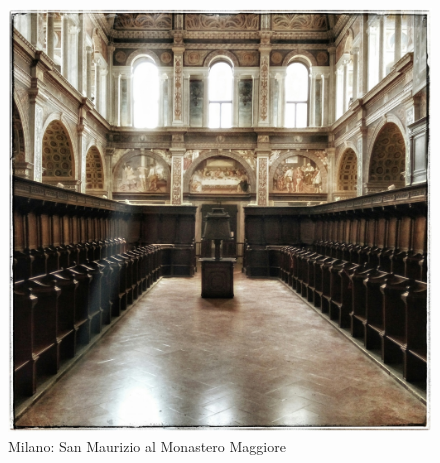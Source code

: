 \documentclass[nols]{tufte-handout}
\begin{document}
\begin{figure}[!b]
  \includegraphics[width=0.8\linewidth]{thumb-lesson_XX.jpeg}
  \caption{Milano: San Maurizio al Monastero Maggiore}
  \label{fig:textfig}
\end{figure}

 


\end{document}
